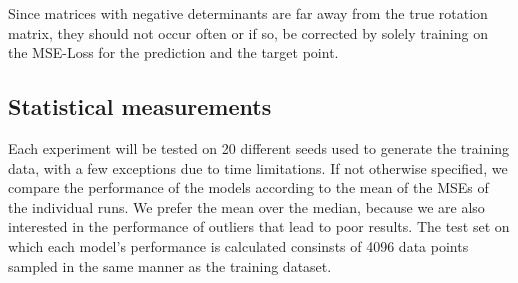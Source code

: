 Since matrices with negative determinants are far away from the true rotation matrix, they should not occur often or if so, be corrected by solely training on the MSE-Loss for the prediction and the target point. 

\subsection{Statistical measurements}
Each experiment will be tested on 20 different seeds used to generate the training data, with a few exceptions due to time limitations. If not otherwise specified, we compare the performance of the models according to the mean of the MSEs of the individual runs. We prefer the mean over the median, because we are also interested in the performance of outliers that lead to poor results. The test set on which each model's performance is calculated consinsts of 4096 data points sampled in the same manner as the training dataset.\\








\clearpage

